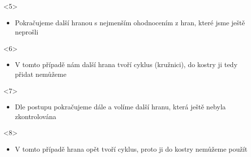 \documentclass[hidelinks, 10pt, pdf, hyperref={unicode}]{beamer}
\begin{document}
\begin{frame}[t]
        \begin{onlyenv}<5>
            \begin{center}
            \end{center}
                \begin{itemize}  
                    \item{Pokračujeme další hranou s nejmenším ohodnocením z hran, které jsme ještě neprošli}
                \end{itemize} 
        \end{onlyenv}

        \begin{onlyenv}<6>
            \begin{center}
            \end{center}
                \begin{itemize}
                    \item{V tomto případě nám další hrana tvoří cyklus (kružnici), do kostry ji tedy přidat nemůžeme}
                \end{itemize} 
        \end{onlyenv}

        \begin{onlyenv}<7>
            \begin{center}
            \end{center}
                \begin{itemize}
                    \item{Dle postupu pokračujeme dále a volíme další hranu, která ještě nebyla zkontrolována}
                \end{itemize}
        \end{onlyenv}

        \begin{onlyenv}<8>
            \begin{center}
            \end{center}
                \begin{itemize}
                    \item{V tomto případě hrana opět tvoří cyklus, proto ji do kostry nemůžeme použít}
                \end{itemize} 
        \end{onlyenv}


\end{frame}
\end{document}
